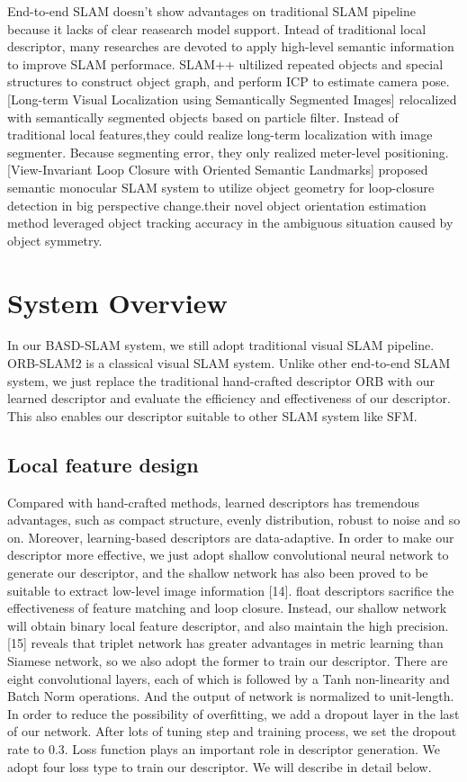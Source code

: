 \documentclass[letterpaper, 10 pt, conference]{ieeeconf}  %
\begin{document}
End-to-end SLAM doesn't show advantages on traditional SLAM pipeline because it lacks of clear reasearch model support. Intead of traditional local descriptor, many researches are devoted to apply high-level semantic information to improve SLAM performace. 
SLAM++ ultilized repeated objects and special structures to construct object graph, and perform ICP to estimate camera pose.  
[Long-term Visual Localization using Semantically Segmented Images] relocalized with semantically segmented objects based on particle filter. Instead of traditional local features,they could realize long-term localization with image segmenter. Because segmenting error, they only realized meter-level positioning.  
[View-Invariant Loop Closure with Oriented Semantic Landmarks] proposed semantic monocular SLAM system  to utilize object geometry for loop-closure detection in big perspective change.their novel object orientation estimation method  leveraged object tracking accuracy in the ambiguous situation caused by object symmetry.



\section{System Overview}
In our BASD-SLAM system, we still adopt traditional visual SLAM pipeline. ORB-SLAM2 is a classical visual SLAM system. Unlike other end-to-end SLAM system, we just replace the traditional hand-crafted descriptor ORB with our learned descriptor and evaluate the efficiency and effectiveness of our descriptor. This also enables our descriptor suitable to other SLAM system like SFM.

\subsection{Local feature design } 
Compared with hand-crafted methods, learned descriptors has tremendous advantages, such as compact structure, evenly distribution, robust to noise and so on. Moreover, learning-based descriptors are data-adaptive. In order to make our descriptor more effective, we just adopt shallow convolutional neural network to generate our descriptor, and the shallow network has also been proved to be suitable to extract low-level image information [14]. float descriptors sacrifice the effectiveness of feature matching and loop closure. Instead, our shallow network will obtain binary local feature descriptor, and also maintain the high precision.
	[15] reveals that triplet network has greater advantages in metric learning than Siamese network, so we also adopt the former to train our descriptor. There are eight convolutional layers, each of which is followed by a Tanh non-linearity and Batch Norm operations. And the output of network is normalized to unit-length. In order to reduce the possibility of overfitting, we add a dropout layer in the last of our network. After lots of tuning step and training process, we set the dropout rate to 0.3.
	Loss function plays an important role in descriptor generation. We adopt four loss type to train our descriptor. We will describe in detail below.
\end{document}
